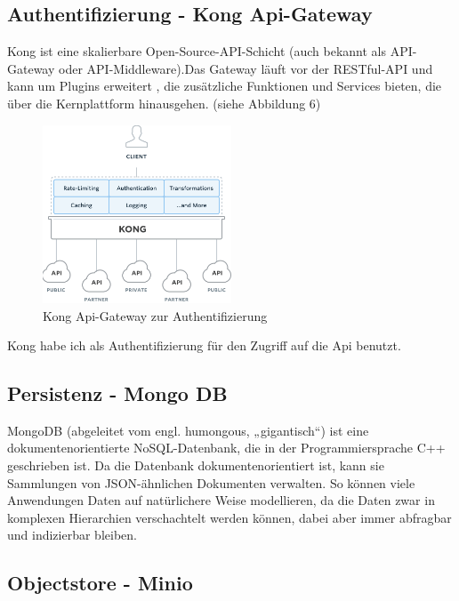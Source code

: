 \documentclass[12pt]{article}
\begin{document}
\subsection{Authentifizierung - Kong Api-Gateway}

Kong ist eine skalierbare Open-Source-API-Schicht (auch bekannt als API-Gateway oder API-Middleware).Das Gateway läuft vor der RESTful-API und kann um Plugins erweitert , die zusätzliche Funktionen und Services bieten, die über die Kernplattform hinausgehen. (siehe Abbildung 6)

\begin{figure}[h!]
  \centering
  \includegraphics[width=0.5\textwidth]{images/kong_arch2.png}
  \caption{Kong Api-Gateway zur Authentifizierung}
  \label{}
\end{figure}

Kong habe ich als Authentifizierung für den Zugriff auf die Api benutzt.


\subsection{Persistenz - Mongo DB}

MongoDB (abgeleitet vom engl. humongous, „gigantisch“) ist eine dokumentenorientierte NoSQL-Datenbank, die in der Programmiersprache C++ geschrieben ist. Da die Datenbank dokumentenorientiert ist, kann sie Sammlungen von JSON-ähnlichen Dokumenten verwalten. So können viele Anwendungen Daten auf natürlichere Weise modellieren, da die Daten zwar in komplexen Hierarchien verschachtelt werden können, dabei aber immer abfragbar und indizierbar bleiben.

\subsection{Objectstore - Minio}
\end{document}

